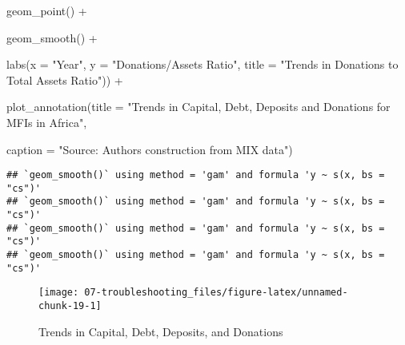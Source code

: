 \documentclass[a4paper,nobind]{templates/ociamthesis}
\newenvironment{Shaded}{\begin{snugshade}}{\end{snugshade}}
\newcommand{\AttributeTok}[1]{\textcolor[rgb]{0.77,0.63,0.00}{#1}}
\newcommand{\FunctionTok}[1]{\textcolor[rgb]{0.00,0.00,0.00}{#1}}
\newcommand{\NormalTok}[1]{#1}
\newcommand{\SpecialCharTok}[1]{\textcolor[rgb]{0.00,0.00,0.00}{#1}}
\newcommand{\StringTok}[1]{\textcolor[rgb]{0.31,0.60,0.02}{#1}}
\renewenvironment{Shaded}
{
  \vspace{10pt}%
  \begin{snugshade}%
}{%
  \end{snugshade}%
  \vspace{8pt}%
}
\begin{document}
\begin{landscape}
\begin{Shaded}
\begin{Highlighting}[]
  \FunctionTok{geom\_point}\NormalTok{() }\SpecialCharTok{+} 
  
  \FunctionTok{geom\_smooth}\NormalTok{() }\SpecialCharTok{+} 
  
  \FunctionTok{labs}\NormalTok{(}\AttributeTok{x =} \StringTok{"Year"}\NormalTok{, }\AttributeTok{y =} \StringTok{"Donations/Assets Ratio"}\NormalTok{, }\AttributeTok{title =} \StringTok{"Trends in Donations to Total Assets Ratio"}\NormalTok{)) }\SpecialCharTok{+} 
  
  \FunctionTok{plot\_annotation}\NormalTok{(}\AttributeTok{title =} \StringTok{"Trends in Capital, Debt, Deposits and Donations for MFIs in Africa"}\NormalTok{, }
                  
                  \AttributeTok{caption =} \StringTok{"Source: Authors\textquotesingle{} construction from MIX data"}\NormalTok{)}
\end{Highlighting}
\end{Shaded}

\begin{verbatim}
## `geom_smooth()` using method = 'gam' and formula 'y ~ s(x, bs = "cs")'
## `geom_smooth()` using method = 'gam' and formula 'y ~ s(x, bs = "cs")'
## `geom_smooth()` using method = 'gam' and formula 'y ~ s(x, bs = "cs")'
## `geom_smooth()` using method = 'gam' and formula 'y ~ s(x, bs = "cs")'
\end{verbatim}

\begin{figure}

{\centering \texttt{[image: 07-troubleshooting\_files/figure-latex/unnamed-chunk-19-1]} 

}

\caption{Trends in Capital, Debt, Deposits, and Donations}\label{fig:unnamed-chunk-19}
\end{figure}

\end{landscape}
\end{document}

